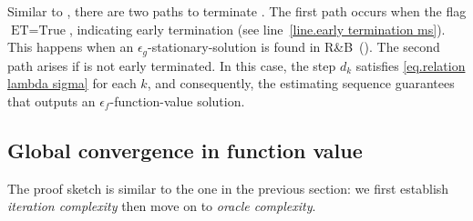 \documentclass{article}
\numberwithin{equation}{section}
\numberwithin{equation}{section}
\begin{document}
Similar to , there are two paths to terminate . The first path occurs when the flag $\textrm{ET} = \text{True}$, indicating early termination (see line~\ref{line.early termination ms}). This happens when an $\epsilon_g$-stationary-solution is found in R\&B~().
The second path arises if  is not early terminated. In this case, the step $d_k$ satisfies \eqref{eq.relation lambda sigma} for each $k$, and consequently, the estimating sequence guarantees that  outputs an $\epsilon_f$-function-value solution.
\subsection{Global convergence in function value}
The proof sketch is similar to the one in the previous section: we first establish \textit{iteration complexity} then move on to \textit{oracle complexity}.
\end{document}
